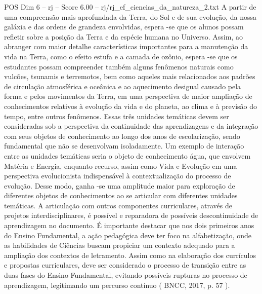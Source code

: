 \begin{textsample}{POS Dim 6 – rj – Score 6.00 – rj/rj\_ef\_ciencias\_da\_natureza\_2.txt}
A partir de uma compreensão mais aprofundada da Terra, do Sol e de sua evolução, da nossa galáxia e das ordens de grandeza envolvidas, espera -se que os alunos possam refletir sobre a posição da Terra e da espécie humana no Universo.
Assim, ao abranger com maior detalhe características importantes para a manutenção da vida na Terra, como o efeito estufa e a camada de ozônio, espera -se que os estudantes possam compreender também alguns fenômenos naturais como vulcões, tsunamis e terremotos, bem como aqueles mais relacionados aos padrões de circulação atmosférica e oceânica e ao aquecimento desigual causado pela forma e pelos movimentos da Terra, em uma perspectiva de maior ampliação de conhecimentos relativos à evolução da vida e do planeta, ao clima e à previsão do tempo, entre outros fenômenos.
Essas três unidades temáticas devem ser consideradas sob a perspectiva da continuidade das aprendizagens e da integração com seus objetos de conhecimento ao longo dos anos de escolarização, sendo fundamental que não se desenvolvam isoladamente.
Um exemplo de interação entre as unidades temáticas seria o objeto de conhecimento água, que envolvem Matéria e Energia, enquanto recurso, assim como Vida e Evolução em uma perspectiva evolucionista indispensável à contextualização do processo de evolução.
Desse modo, ganha -se uma amplitude maior para exploração de diferentes objetos de conhecimentos ao se articular com diferentes unidades temáticas.
A articulação com outros componentes curriculares, através de projetos interdisciplinares, é possível e reparadora de possíveis descontinuidade de aprendizagem no documento.
É importante destacar que nos dois primeiros anos do Ensino Fundamental, a ação pedagógica deve ter foco na alfabetização, onde as habilidades de Ciências buscam propiciar um contexto adequado para a ampliação dos contextos de letramento.
Assim como na elaboração dos currículos e propostas curriculares, deve ser considerado o processo de transição entre as duas fases do Ensino Fundamental, evitando possíveis rupturas no processo de aprendizagem, legitimando um percurso contínuo ( BNCC, 2017, p. 57 ).

\end{textsample}

